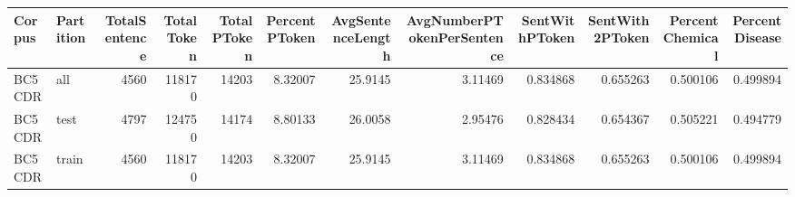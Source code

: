 \begin{tabular}{llrrrrrrrrrr}
\hline
 Corpus   & Partition   &   TotalSentence &   TotalToken &   TotalPToken &   PercentPToken &   AvgSentenceLength &   AvgNumberPTokenPerSentence &   SentWithPToken &   SentWith2PToken &   PercentChemical &   PercentDisease \\
\hline
 BC5CDR   & all         &            4560 &       118170 &         14203 &         8.32007 &             25.9145 &                      3.11469 &         0.834868 &          0.655263 &          0.500106 &         0.499894 \\
 BC5CDR   & test        &            4797 &       124750 &         14174 &         8.80133 &             26.0058 &                      2.95476 &         0.828434 &          0.654367 &          0.505221 &         0.494779 \\
 BC5CDR   & train       &            4560 &       118170 &         14203 &         8.32007 &             25.9145 &                      3.11469 &         0.834868 &          0.655263 &          0.500106 &         0.499894 \\
\hline
\end{tabular}